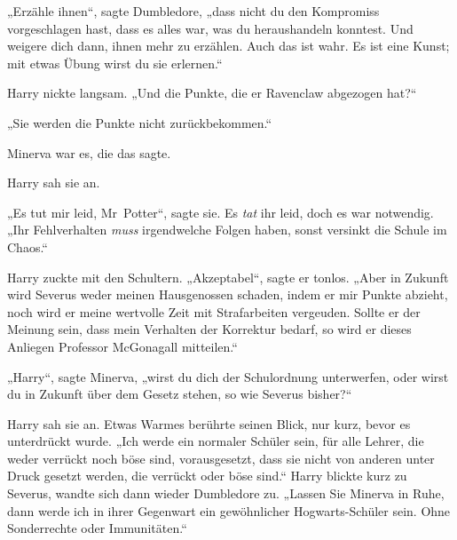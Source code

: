 „Erzähle ihnen“, sagte Dumbledore, „dass nicht du den Kompromiss vorgeschlagen hast, dass es alles war, was du heraushandeln konntest. Und weigere dich dann, ihnen mehr zu erzählen. Auch das ist wahr. Es ist eine Kunst; mit etwas Übung wirst du sie erlernen.“

Harry nickte langsam.
„Und die Punkte, die er Ravenclaw abgezogen hat?“

„Sie werden die Punkte nicht zurückbekommen.“

Minerva war es, die das sagte.

Harry sah sie an.

„Es tut mir leid, Mr~Potter“, sagte sie. Es \emph{tat} ihr leid, doch es war notwendig.
„Ihr Fehlverhalten \emph{muss} irgendwelche Folgen haben, sonst versinkt die Schule im Chaos.“

Harry zuckte mit den Schultern.
„Akzeptabel“, sagte er tonlos.
„Aber in Zukunft wird Severus weder meinen Hausgenossen schaden, indem er mir Punkte abzieht, noch wird er meine wertvolle Zeit mit Strafarbeiten vergeuden. Sollte er der Meinung sein, dass mein Verhalten der Korrektur bedarf, so wird er dieses Anliegen Professor McGonagall mitteilen.“

„Harry“, sagte Minerva, „wirst du dich der Schulordnung unterwerfen, oder wirst du in Zukunft über dem Gesetz stehen, so wie Severus bisher?“

Harry sah sie an. Etwas Warmes berührte seinen Blick, nur kurz, bevor es unterdrückt wurde.
„Ich werde ein normaler Schüler sein, für alle Lehrer, die weder verrückt noch böse sind, vorausgesetzt, dass sie nicht von anderen unter Druck gesetzt werden, die verrückt oder böse sind.“ Harry blickte kurz zu Severus, wandte sich dann wieder Dumbledore zu.
„Lassen Sie Minerva in Ruhe, dann werde ich in ihrer Gegenwart ein gewöhnlicher Hogwarts-Schüler sein. Ohne Sonderrechte oder Immunitäten.“

